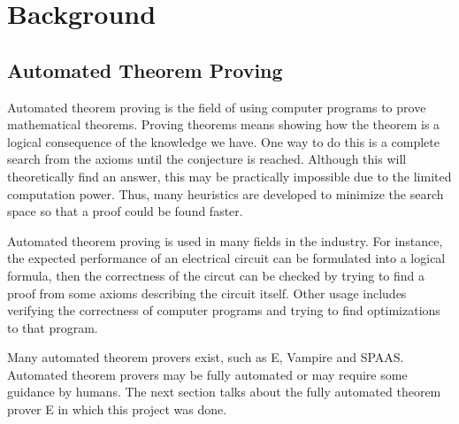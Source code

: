 \chapter{Background}\label{chap:background}

\section{Automated Theorem Proving}
Automated theorem proving is the field of using computer programs to prove mathematical theorems. Proving theorems means showing how the theorem is a logical consequence of the knowledge we have. One way to do this is a complete search from the axioms until the conjecture is reached. Although this will theoretically find an answer, this may be practically impossible due to the limited computation power. Thus, many heuristics are developed to minimize the search space so that a proof could be found faster.

Automated theorem proving is used in many fields in the industry. For instance, the expected performance of an electrical circuit can be formulated into a logical formula, then the correctness of the circut can be checked by trying to find a proof from some axioms describing the circuit itself. Other usage includes verifying the correctness of computer programs and trying to find optimizations to that program.

Many automated theorem provers exist, such as E, Vampire and SPAAS. Automated theorem provers may be fully automated or may require some guidance by humans. The next section talks about the fully automated theorem prover E in which this project was done.

